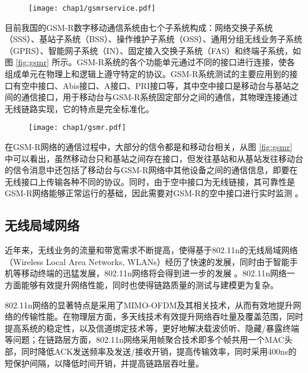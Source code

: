 \begin{figure}[!htp]
\centering
\texttt{[image: chap1/gsmrservice.pdf]}
\end{figure}

目前我国的GSM-R数字移动通信系统由七个子系统构成：网络交换子系统（SSS）、基站子系统（BSS）、操作维护子系统（OSS）、通用分组无线业务子系统（GPRS）、智能网子系统（IN）、固定接入交换子系统（FAS）和终端子系统，如图 \ref{fig:gsmr} 所示。GSM-R系统的各个功能单元通过不同的接口进行连接，使各组成单元在物理上和逻辑上遵守特定的协议。GSM-R系统测试的主要应用到的接口有空中接口、Abis接口、A接口、PRI接口等，其中空中接口是移动台与基站之间的通信接口，用于移动台与GSM-R系统固定部分之间的通信，其物理连接通过无线链路实现，它的特点是完全标准化。

\begin{figure}[!htp]
\centering
\texttt{[image: chap1/gsmr.pdf]}
\end{figure}

在GSM-R网络的通信过程中，大部分的信令都是和移动台相关，从图 \ref{fig:gsmr} 中可以看出，虽然移动台只和基站之间存在接口，但发往基站和从基站发往移动台的信令消息中还包括了移动台与GSM-R网络中其他设备之间的通信信息，即要在无线接口上传输各种不同的协议。同时，由于空中接口为无线链接，其可靠性是GSM-R网络能够正常运行的基础，因此需要对GSM-R的空中接口进行实时监测 \cite{baldini2010early}。

\subsection{无线局域网络}
\label{sec:80211n}

近年来，无线业务的流量和带宽需求不断提高，使得基于802.11n的无线局域网络（Wireless Local Area Networks, WLANs）经历了快速的发展，同时由于智能手机等移动终端的迅猛发展，802.11n网络将会得到进一步的发展 \cite{Bala2010wifi}。802.11n网络一方面能够有效提升网络性能，同时也使得链路质量的测试与建模更为复杂。

802.11n网络的显著特点是采用了MIMO-OFDM及其相关技术，从而有效地提升网络的传输性能。在物理层方面，多天线技术有效提升网络吞吐量及覆盖范围，同时提高系统的稳定性，以及信道绑定技术等，更好地解决载波侦听、隐藏/暴露终端等问题；在链路层方面，802.11n网络采用帧聚合技术即多个帧共用一个MAC头部，同时降低ACK发送频率及发送/接收开销，提高传输效率，同时采用400ns的短保护间隔，以降低时间开销，并提高链路层吞吐量。

